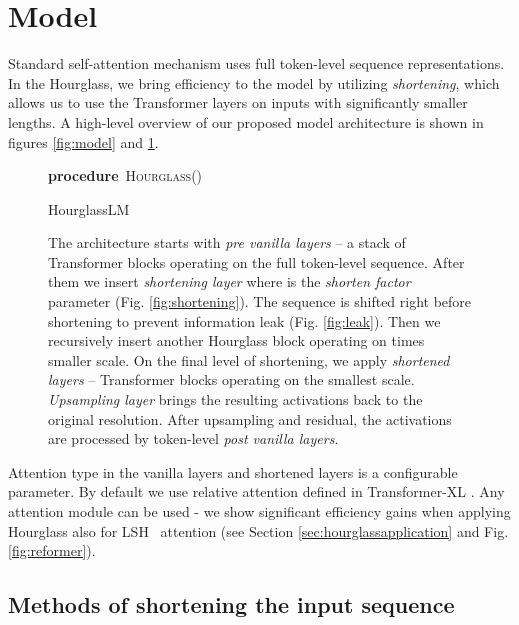 \documentclass[11pt]{article}
\makeatletter
\newcommand\algorithmicprocedure{\textbf{procedure}}
\newcommand\PROCEDURE[3][default]{\ALC@it
  \algorithmicprocedure\ \textsc{#2}(#3)\begin{ALC@prc}}
\newcommand\ENDPROCEDURE{\end{ALC@prc}}
\newenvironment{ALC@prc}{\begin{ALC@g}}{\end{ALC@g}}
\newcommand{\s}{\emph{shortening}}
\makeatother
\begin{document}
\section{Model}

Standard self-attention mechanism uses full token-level sequence representations. In the Hourglass, we bring efficiency to the model by utilizing \s, which allows us to use the Transformer layers on inputs with significantly smaller lengths. A high-level overview of our proposed model architecture is shown in figures  \ref{fig:model} and \ref{fig:alg}. 

\begin{figure}[ht] 
\begin{algorithm}[H]
\begin{algorithmic}
\PROCEDURE[]{Hourglass}{}
\STATE 
\STATE 
{}
    \STATE 
\ELSE
    \STATE 
\ENDIF
\STATE 
\STATE 
\RETURN 
\ENDPROCEDURE
\end{algorithmic}
\caption{HourglassLM}
\end{algorithm}
\caption{
The architecture starts with \emph{pre vanilla layers} -- a stack of Transformer blocks operating on the full token-level sequence. After them we insert \emph{shortening layer} where  is the \emph{shorten factor} parameter (Fig. \ref{fig:shortening}). The sequence is shifted right before shortening to prevent information leak (Fig. \ref{fig:leak}). Then we recursively insert another Hourglass block operating on  times smaller scale. On the final level of shortening, we apply \emph{shortened layers} -- Transformer blocks operating on the smallest scale.
\emph{Upsampling layer} brings the resulting activations  back to the original resolution. After upsampling and residual, the activations are processed by token-level \emph{post vanilla layers}.
}
\label{fig:alg}
\end{figure}

Attention type in the vanilla layers and shortened layers is a configurable parameter. By default we use relative attention defined in Transformer-XL \cite{dai2019transformerxl}. Any attention module can be used - we show significant efficiency gains when applying Hourglass also for LSH~\cite{kitaev2020reformer} attention (see Section \ref{sec:hourglassapplication} and Fig. \ref{fig:reformer}). 


\subsection{Methods of shortening the input sequence}\label{sec:shortening}
\end{document}
